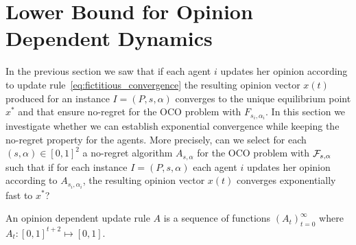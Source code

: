 \section{Lower Bound for Opinion Dependent Dynamics}\label{s:lower_bound}

In the previous section we saw that if each
agent $i$ updates her opinion according to
update rule~\ref{eq:fictitious_convergence}
the resulting opinion vector $x(t)$ produced
for an instance $I=(P,s,\alpha)$ converges
to the unique equilibrium point $x^*$ and
that ensure no-regret for the OCO problem 
with $F_{s_i,\alpha_i}$. In this section we 
investigate whether we can establish exponential
convergence while keeping the no-regret property
for the agents. More precisely, can we select
for each $(s,\alpha) \in [0,1]^2$ a no-regret algorithm
$A_{s,\alpha}$ for the OCO problem with 
$\mathcal{F}_{s,\alpha}$ such that if for each instance
$I=(P,s,\alpha)$ each agent $i$ updates her 
opinion according to $A_{s_i,\alpha_i}$,
the resulting opinion vector $x(t)$ converges 
exponentially fast to $x^*$?


\begin{definition}\label{d:opinion_dependent_dynamics}
An opinion dependent update rule $A$ is a sequence of functions $(A_t)_{t=0}^\infty$ where
$A_t: [0,1]^{t+2}\mapsto [0,1]$.
\end{definition}


